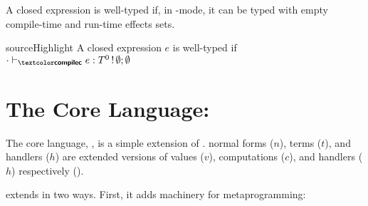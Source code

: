 A closed \sourceLang{} expression is well-typed if, in \compilemode{}-mode, it can be typed with empty compile-time and run-time effects sets. 
\begin{definition}{sourceHighlight}
  A closed expression $e$ is well-typed if $\ctypejudge[\cdot]{e}{T^0 \, ! \, \emptyset;\emptyset}$
\end{definition}

\section{The Core Language: \texorpdfstring{\coreLang{}}{Lambda-Op-AST}}\label{section:core-lang}
The core language, \coreLang{}, is a simple extension of \efflang{}. \coreLang{} normal forms ($n$), terms ($t$), and handlers ($h$) are extended versions of \efflang{} values ($v$), computations ($c$), and handlers ($h$) respectively ().  

\coreLang{} extends \efflang{} in two ways. First, it adds machinery for metaprogramming:

